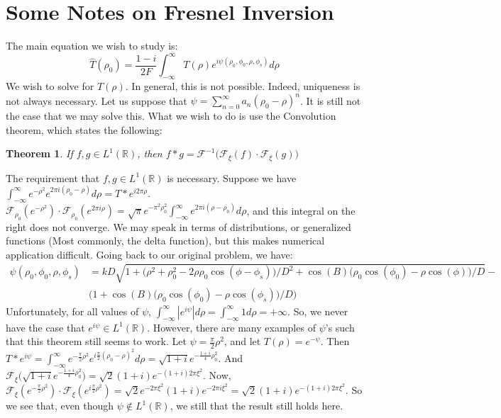 \documentclass{article}
\theoremstyle{mystyle}
\newtheorem{theorem}{Theorem}[section]
\begin{document}
\section{Some Notes on Fresnel Inversion}
The main equation we wish to study is:
\begin{equation*}
\hat{T}(\rho_0) = \frac{1-i}{2F}\int_{-\infty}^{\infty} T(\rho)e^{i\psi(\rho_0,\phi_0,\rho,\phi_s)}d\rho
\end{equation*}
We wish to solve for $T(\rho)$. In general, this is not possible. Indeed, uniqueness is not always necessary. Let us suppose that $\psi = \sum_{n=0}^{\infty}a_n(\rho_0 - \rho)^n$. It is still not the case that we may solve this. What we wish to do is use the Convolution theorem, which states the following:
\begin{theorem}
If $f,g\in L^{1}(\mathbb{R})$, then $f*g = \mathcal{F}^{-1}\big(\mathcal{F}_{\xi}(f)\cdot \mathcal{F}_{\xi}(g)\big)$
\end{theorem}
The requirement that $f,g\in L^{1}(\mathbb{R})$ is necessary. Suppose we have $\int_{-\infty}^{\infty} e^{-\rho^2}e^{2\pi i(\rho_0 - \rho)}d\rho = T*e^{i2\pi \rho}$. $\mathcal{F}_{\rho_0}(e^{-\rho^2})\cdot \mathcal{F}_{\rho_0}(e^{2\pi i \rho}) = \sqrt{\pi}e^{-\pi^2 \rho_0^2}\int_{-\infty}^{\infty}e^{2\pi i(\rho-\rho_0)}d\rho$, and this integral on the right does not converge. We may speak in terms of distributions, or generalized functions (Most commonly, the delta function), but this makes numerical application difficult. Going back to our original problem, we have:
\begin{align*}
\nonumber \psi(\rho_0,\phi_0,\rho,\phi_s) &= kD\sqrt{1+\big(\rho^2+\rho_0^2 - 2\rho \rho_0 \cos(\phi - \phi_s)\big)/D^2 + \cos(B)\big(\rho_0\cos(\phi_0) - \rho\cos(\phi)\big)/D} - \\ &\bigg(1+\cos(B)(\rho_0\cos(\phi_0) - \rho\cos(\phi_s)\big)/D\bigg)
\end{align*}
Unfortunately, for all values of $\psi$, $\int_{-\infty}^{\infty} |e^{i\psi}|d\rho = \int_{-\infty}^{\infty} 1d\rho = +\infty$. So, we never have the case that $e^{i\psi} \in L^{1}(\mathbb{R})$. However, there are many examples of $\psi$'s such that this theorem still seems to work. Let $\psi = \frac{\pi}{2}\rho^2$, and let $T(\rho) = e^{-\psi}$. Then $T*e^{i\psi} = \int_{-\infty}^{\infty} e^{-\frac{\pi}{2}\rho^2}e^{i\frac{\pi}{2}(\rho_0-\rho)^2}d\rho = \sqrt{1+i}e^{-\frac{1+i}{4}\rho_0^2}$. And $\mathcal{F}_{\xi}\big(\sqrt{1+i}e^{-\frac{1+i}{4}\rho_0^2}\big) = \sqrt{2}(1+i)e^{-(1+i)2\pi \xi^2}$. Now, $\mathcal{F}_{\xi}(e^{-\frac{\pi}{2}\rho^2})\cdot \mathcal{F}_{\xi}(e^{i\frac{\pi}{2}\rho^2}) = \sqrt{2}e^{-2\pi \xi^2}(1+i)e^{-2\pi i \xi^2} = \sqrt{2}(1+i)e^{-(1+i)2\pi \xi^2}$. So we see that, even though $\psi \notin L^{1}(\mathbb{R})$, we still that the result still holds here. 
\end{document}
